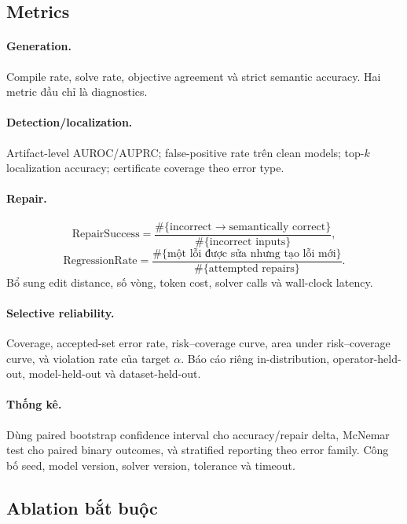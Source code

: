 \documentclass[11pt,a4paper]{article}
\begin{document}
\subsection{Metrics}

\paragraph{Generation.}
Compile rate, solve rate, objective agreement và strict semantic accuracy. Hai metric đầu chỉ là diagnostics.

\paragraph{Detection/localization.}
Artifact-level AUROC/AUPRC; false-positive rate trên clean models; top-\(k\) localization accuracy; certificate coverage theo error type.

\paragraph{Repair.}
\[
\mathrm{RepairSuccess}=
\frac{\#\{\text{incorrect}\rightarrow\text{semantically correct}\}}
     {\#\{\text{incorrect inputs}\}},
\]
\[
\mathrm{RegressionRate}=
\frac{\#\{\text{một lỗi được sửa nhưng tạo lỗi mới}\}}
     {\#\{\text{attempted repairs}\}}.
\]
Bổ sung edit distance, số vòng, token cost, solver calls và wall-clock latency.

\paragraph{Selective reliability.}
Coverage, accepted-set error rate, risk--coverage curve, area under risk--coverage curve, và violation rate của target \(\alpha\). Báo cáo riêng in-distribution, operator-held-out, model-held-out và dataset-held-out.

\paragraph{Thống kê.}
Dùng paired bootstrap confidence interval cho accuracy/repair delta, McNemar test cho paired binary outcomes, và stratified reporting theo error family. Công bố seed, model version, solver version, tolerance và timeout.

\subsection{Ablation bắt buộc}
\end{document}

